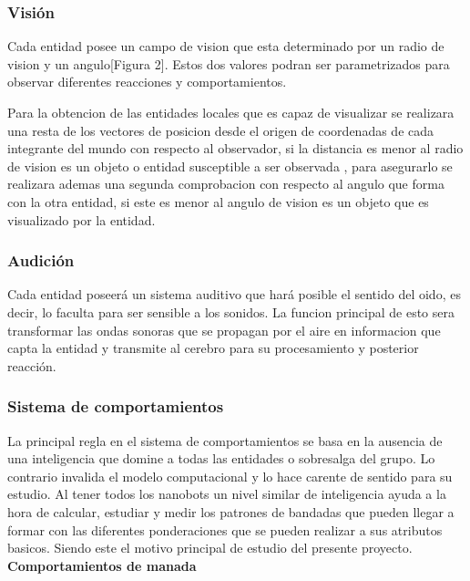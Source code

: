\subsubsection{Visión}
\label{sec:vision}

Cada entidad posee un campo de vision que esta determinado por un radio de vision y un angulo[Figura 2]. Estos dos valores podran ser parametrizados para observar diferentes reacciones y comportamientos. 

Para la obtencion de las entidades locales que es capaz de visualizar se realizara una resta de los vectores de posicion desde el origen de coordenadas de cada integrante del mundo con respecto al observador, si la distancia es menor al radio de vision es un objeto o entidad susceptible a ser observada , para asegurarlo se realizara ademas una segunda comprobacion con respecto al angulo que forma con la otra entidad, si este  es menor al angulo de vision es un objeto que es visualizado por la entidad.


\subsubsection{Audición}
\label{sec:audicion}

Cada entidad poseerá un sistema auditivo que hará posible el sentido del oido, es decir, lo faculta para ser sensible a los sonidos. La funcion principal de esto sera transformar las ondas sonoras que se propagan por el aire en informacion que capta la entidad y transmite al cerebro para su procesamiento y posterior reacción.


\subsubsection{Sistema de comportamientos}
\label{sec:sistema_comportamientos}

La principal regla en el sistema de comportamientos se basa en la ausencia de una inteligencia que domine a todas las entidades o sobresalga del grupo. Lo contrario invalida el modelo computacional y lo hace carente de sentido para su estudio. Al tener todos los nanobots un nivel similar de inteligencia ayuda a la hora de calcular, estudiar y medir los patrones de bandadas que pueden llegar a formar con las diferentes  ponderaciones que se pueden realizar a sus atributos basicos. Siendo este el motivo principal de estudio del presente proyecto.\\

\noindent\textbf{Comportamientos de manada}

